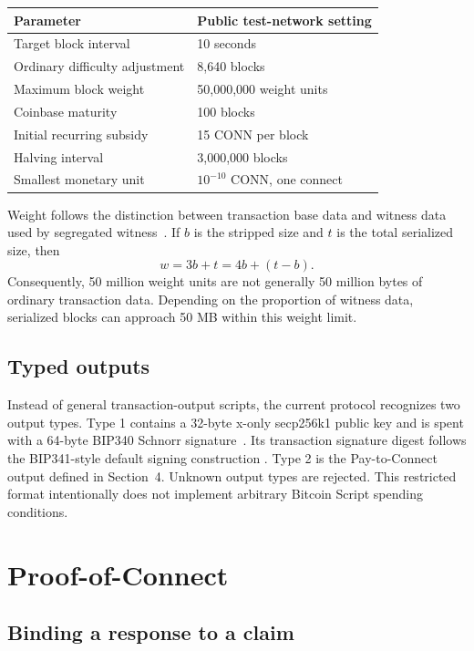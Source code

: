 \documentclass[11pt,a4paper]{article}
\begin{document}
\begin{center}
\begin{tabular}{@{}ll@{}}
\toprule
Parameter & Public test-network setting \\
\midrule
Target block interval & 10 seconds \\
Ordinary difficulty adjustment & 8,640 blocks \\
Maximum block weight & 50,000,000 weight units \\
Coinbase maturity & 100 blocks \\
Initial recurring subsidy & 15 CONN per block \\
Halving interval & 3,000,000 blocks \\
Smallest monetary unit & $10^{-10}$ CONN, one connect \\
\bottomrule
\end{tabular}
\end{center}

Weight follows the distinction between transaction base data and witness data
used by segregated witness~\cite{segwit}. If $b$ is the stripped size and $t$ is
the total serialized size, then
\begin{equation}
  w=3b+t=4b+(t-b).
\end{equation}
Consequently, 50 million weight units are not generally 50 million bytes of
ordinary transaction data. Depending on the proportion of witness data,
serialized blocks can approach 50 MB within this weight limit.

\subsection*{Typed outputs}

Instead of general transaction-output scripts, the current protocol recognizes
two output types. Type 1 contains a 32-byte x-only secp256k1 public key and is
spent with a 64-byte BIP340 Schnorr signature~\cite{schnorr}. Its transaction
signature digest follows the BIP341-style default signing construction
\cite{taproot}. Type 2 is the Pay-to-Connect output defined in Section~4.
Unknown output types are rejected. This restricted format intentionally does
not implement arbitrary Bitcoin Script spending conditions.

\section{Proof-of-Connect}

\subsection*{Binding a response to a claim}
\end{document}
